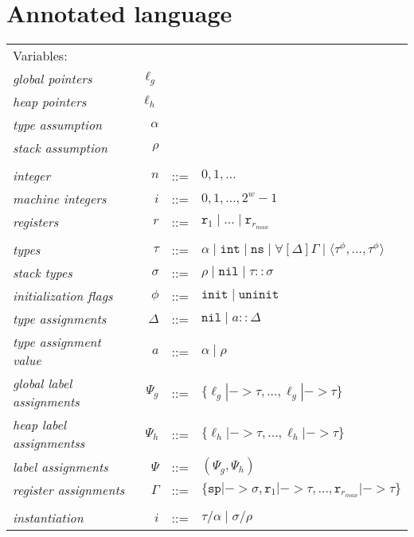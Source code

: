 \section{Annotated language}


\begin{tabular}{lrcl}
Variables: \\
\textit{global pointers}          & $\ell_g$ \\
\textit{heap pointers}            & $\ell_h$ \\
\textit{type assumption}          & $\alpha$ \\
\textit{stack assumption}         & $\rho$ \\
\\
\textit{integer}                  & $n$ & ::= & $0, 1, \dots$ \\
\textit{machine integers}         & $i$ & ::= & $0, 1, \dots, 2^{w}-1$ \\
\textit{registers}                & $r$ & ::= & $\mathtt{r}_1 \mid \dots \mid \mathtt{r}_{r_{max}}$ \\
\\
\textit{types}                    & $\tau$ & ::= & $\alpha \mid \mathtt{int} \mid \mathtt{ns} \mid \mathtt\forall[ \Delta ] \Gamma \mid \langle\tau^\phi,\dots,\tau^\phi\rangle$ \\
\textit{stack types}              & $\sigma$ & ::= & $\rho \mid \mathtt{nil} \mid \tau :: \sigma$ \\
\textit{initialization flags}     & $\phi$ & ::= & $\mathtt{init} \mid \mathtt{uninit}$ \\
\textit{type assignments}         & $\Delta$ & ::= & $\mathtt{nil} \mid a :: \Delta$ \\
\textit{type assignment value}    & $a$ & ::= & $\alpha \mid \rho$ \\
\textit{global label assignments} & $\Psi_g$ & ::= & $\{\ell_g |-> \tau, \dots, \ell_g |-> \tau\}$ \\
\textit{heap label assignmentss}  & $\Psi_h$ & ::= & $\{\ell_h |-> \tau, \dots, \ell_h |-> \tau\}$ \\
\textit{label assignments}        & $\Psi$ & ::= & $(\Psi_g , \Psi_h)$ \\
\textit{register assignments}     & $\Gamma$ & ::= & $\{\mathtt{sp} |-> \sigma, \mathtt{r}_1 |-> \tau, \dots, \mathtt{r}_{r_{max}} |-> \tau\}$ \\
\\
\textit{instantiation}            & $i$ & ::= & $\tau/\alpha \mid \sigma/\rho$ \\

\end{tabular}
